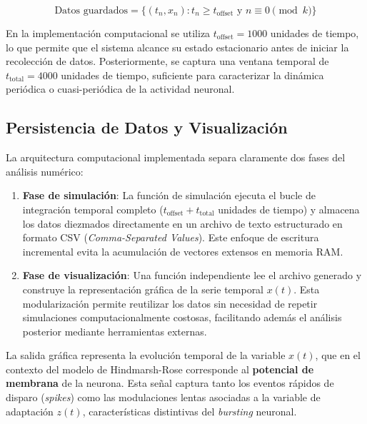 \documentclass{article}
\begin{document}
\begin{equation}
    \text{Datos guardados} = \{(t_n, x_n) : t_n \geq t_{\text{offset}} \text{ y } n \equiv 0 \pmod{k}\}
\end{equation}

En la implementación computacional se utiliza $t_{\text{offset}} = 1000$ unidades de tiempo, lo que permite que el sistema alcance su estado estacionario antes de iniciar la recolección de datos. Posteriormente, se captura una ventana temporal de $t_{\text{total}} = 4000$ unidades de tiempo, suficiente para caracterizar la dinámica periódica o cuasi-periódica de la actividad neuronal.

\subsection{Persistencia de Datos y Visualización}

La arquitectura computacional implementada separa claramente dos fases del análisis numérico:

\begin{enumerate}
    \item \textbf{Fase de simulación}: La función de simulación ejecuta el bucle de integración temporal completo ($t_{\text{offset}} + t_{\text{total}}$ unidades de tiempo) y almacena los datos diezmados directamente en un archivo de texto estructurado en formato CSV (\textit{Comma-Separated Values}). Este enfoque de escritura incremental evita la acumulación de vectores extensos en memoria RAM.
    
    \item \textbf{Fase de visualización}: Una función independiente lee el archivo generado y construye la representación gráfica de la serie temporal $x(t)$. Esta modularización permite reutilizar los datos sin necesidad de repetir simulaciones computacionalmente costosas, facilitando además el análisis posterior mediante herramientas externas.
\end{enumerate}

La salida gráfica representa la evolución temporal de la variable $x(t)$, que en el contexto del modelo de Hindmarsh-Rose corresponde al \textbf{potencial de membrana} de la neurona. Esta señal captura tanto los eventos rápidos de disparo (\textit{spikes}) como las modulaciones lentas asociadas a la variable de adaptación $z(t)$, características distintivas del \textit{bursting} neuronal.
\end{document}
